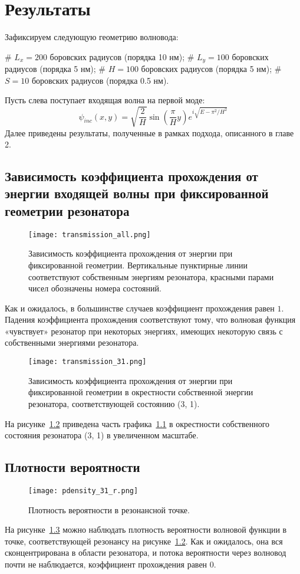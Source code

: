 \chapter{Результаты} 
\label{chapter3}

Зафиксируем следующую геометрию волновода:
\begin{ilist}
# $L_x = 200$ боровских радиусов (порядка 10 нм);
# $L_y = 100$ боровских радиусов (порядка 5 нм);
# $H = 100$ боровских радиусов (порядка 5 нм);
# $S = 10$ боровских радиусов (порядка 0.5 нм).
\end{ilist}
Пусть слева поступает входящая волна на первой моде:
\[
\psi_{inc}(x, y) = \sqrt{\frac{2}{H}} \sin(\frac{\pi}{H} y) e^{i \sqrt{E - \pi^2 / H^2}}
\]
Далее приведены результаты, полученные в рамках подхода, описанного в главе 2.
\section{Зависимость коэффициента прохождения от энергии входящей волны при фиксированной геометрии резонатора}
\begin{figure}[H]
\texttt{[image: transmission\_all.png]}
\caption{Зависимость коэффициента прохождения от энергии при фиксированной геометрии. Вертикальные пунктирные линии соответствуют собственным энергиям резонатора, красными парами чисел обозначены номера состояний.}
\label{fig:transmission_all}
\end{figure}
Как и ожидалось, в большинстве случаев коэффициент прохождения равен $1$. Падения коэффициента прохождения соответствуют тому, что волновая функция «чувствует» резонатор при некоторых энергиях, имеющих некоторую связь с собственными энергиями резонатора.

\begin{figure}[H]
\texttt{[image: transmission\_31.png]}
\caption{Зависимость коэффициента прохождения от энергии при фиксированной геометрии в окрестности собственной энергии резонатора, соответствующей состоянию (3, 1).}
\label{fig:transmission_31}
\end{figure}
На рисунке~\ref{fig:transmission_31} приведена часть графика~\ref{fig:transmission_all} в окрестности собственного состояния резонатора (3, 1) в увеличенном масштабе.

\section{Плотности вероятности}
\begin{figure}[H]
\texttt{[image: pdensity\_31\_r.png]}
\caption{Плотность вероятности в резонансной точке.}
\label{fig:pdensity_31_r}
\end{figure}
На рисунке~\ref{fig:pdensity_31_r} можно наблюдать плотность вероятности волновой функции в точке, соответствующей  резонансу на рисунке~\ref{fig:transmission_31}. Как и ожидалось, она вся сконцентрирована в области резонатора, и потока вероятности через волновод почти не наблюдается, коэффициент прохождения равен $0$.

